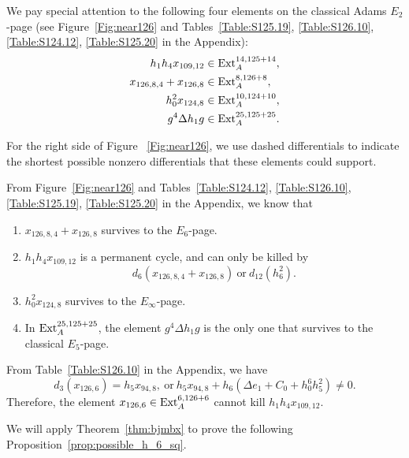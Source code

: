 \documentclass{amsart}
\numberwithin{equation}{section}
\begin{document}
We pay special attention to the following four elements on the classical Adams $E_2$-page (see Figure~\ref{Fig:near126} and Tables~\ref{Table:S125.19}, \ref{Table:S126.10}, \ref{Table:S124.12}, \ref{Table:S125.20} in the Appendix):
\begin{align*}
    h_1h_4x_{109,12} & \in \mathrm{Ext}_A^{14, 125+14}, \\
    x_{126,8,4} + x_{126,8} & \in \mathrm{Ext}_A^{8, 126+8}, \\
    h_0^2x_{124,8} & \in \mathrm{Ext}_A^{10, 124+10},\\
    g^4\Delta h_1g & \in \mathrm{Ext}_A^{25,125+25}.
\end{align*}

For the right side of Figure ~\ref{Fig:near126}, we use dashed differentials to indicate the shortest possible nonzero differentials that these elements could support.

{

}

From Figure~\ref{Fig:near126} and Tables~\ref{Table:S124.12}, \ref{Table:S126.10}, \ref{Table:S125.19}, \ref{Table:S125.20} in the Appendix, we know that
\begin{fact} \label{fact:theta5sqAF}
\begin{enumerate}
    \item $x_{126,8,4} + x_{126,8}$ survives to the $E_6$-page.
    
    \item $h_1h_4x_{109,12}$ is a permanent cycle, and can only be killed by 
    $$d_6(x_{126,8,4} + x_{126,8}) \ \text{or} \ d_{12}(h_6^2).$$
    
    \item $h_0^2x_{124,8}$ survives to the $E_\infty$-page.

    \item In $\mathrm{Ext}_A^{25,125+25}$, the element $g^4\Delta h_1g$ is the only one that survives to the classical $E_5$-page.
\end{enumerate}\end{fact}

\begin{remark}
From Table~\ref{Table:S126.10} in the Appendix, we have
   $$d_3(x_{126,6}) = h_5x_{94,8}, \ \text{or} \ h_5x_{94,8} + h_6(\Delta e_1 + C_0 + h_0^6h_5^2) \neq 0.$$
   Therefore, the element $x_{126,6} \in \mathrm{Ext}_A^{6, 126+6}$ cannot kill $h_1h_4x_{109,12}$.
\end{remark}

We will apply Theorem~\ref{thm:bjmbx} to prove the following Proposition~\ref{prop:possible_h_6_sq}.
\end{document}
